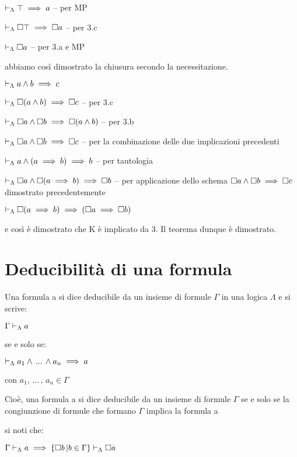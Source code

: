 $\vdash_{\Lambda}\top\implies a$ -- per MP

$\vdash_{\Lambda}\square\top\implies\square a$ -- per 3.c

$\vdash_{\Lambda}\square a$ -- per 3.a e MP

abbiamo così dimostrato la chiusura secondo la necessitazione.

$\vdash_{\Lambda}a\wedge b\implies c$

$\vdash_{\Lambda}\square(a\wedge b)\implies\square c$ -- per 3.c

$\vdash_{\Lambda}\square a\wedge\square b\implies\square(a\wedge b)$ --
per 3.b

$\vdash_{\Lambda}\square a\wedge\square b\implies\square c$ -- per la combinazione
delle due implicazioni precedenti

$\vdash_{\Lambda}a\wedge(a\implies b)\implies b$ -- per tautologia

$\vdash_{\Lambda}\square a\wedge\square(a\implies b)\implies\square b$
-- per applicazione dello schema $\square a\wedge\square b\implies\square c$
dimostrato precedentemente

$\vdash_{\Lambda}\square(a\implies b)\implies(\square a\implies\square b)$

e così è dimostrato che K è implicato da 3. Il teorema dunque è dimostrato.


\section{Deducibilità di una formula}

Una formula a si dice deducibile da un insieme di formule $\Gamma$
in una logica $\Lambda$ e si scrive:

$\Gamma\vdash_{\Lambda}a$

se e solo se:

$\vdash_{\Lambda}a_{1}\wedge\,...\,\wedge a_{n}\implies a$

con $a_{1},\,...\,,\, a_{n}\in\Gamma$

Cioè, una formula a si dice deducibile da un insieme di formule $\Gamma$
se e solo se la congiunzione di formule che formano $\Gamma$ implica
la formula a

si noti che:

$\Gamma\vdash_{\Lambda}a\implies\{\square b\,|b\in\Gamma\}\vdash_{\Lambda}\square a$
